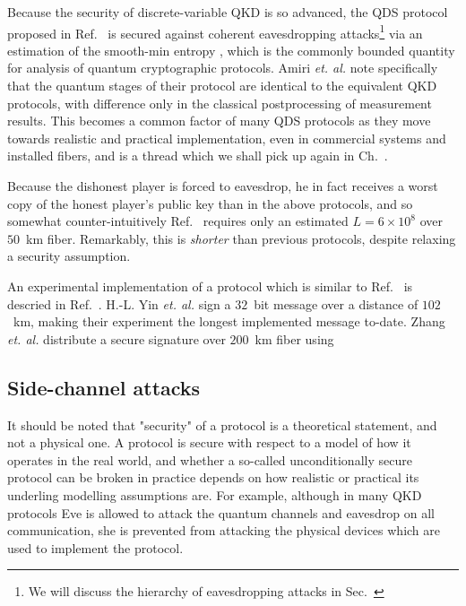 Because the security of discrete-variable QKD is so advanced, the QDS protocol proposed in Ref.~\cite{Amiri2016} is secured against coherent eavesdropping attacks\footnote{We will discuss the hierarchy of eavesdropping attacks in Sec.~} via an estimation of the smooth-min entropy , which is the commonly bounded quantity for analysis of quantum cryptographic protocols. Amiri \emph{et. al.} note specifically that the quantum stages of their protocol are identical to the equivalent QKD protocols, with difference only in the classical postprocessing of measurement results. This becomes a common factor of many QDS protocols as they move towards realistic and practical implementation, even in commercial systems and installed fibers, and is a thread which we shall pick up again in Ch.~.

Because the dishonest player is forced to eavesdrop, he in fact receives a worst copy of the honest player's public key than in the above protocols, and so somewhat counter-intuitively Ref.~\cite{Amiri2016} requires only an estimated $L = 6\times 10^8$ over $50$~km fiber. Remarkably, this is \emph{shorter} than previous protocols, despite relaxing a security assumption.

An experimental implementation of a protocol which is similar to Ref.~\cite{Amiri2016} is descried in Ref.~\cite{Yin2017c}. H.-L. Yin \emph{et. al.} sign a $32$~bit message over a distance of $102$~km, making their experiment the longest implemented message to-date. Zhang \emph{et. al.} distribute a secure signature over $200$~km fiber \cite{Zhang2018b} using 


\subsection*{Side-channel attacks}
It should be noted that "security" of a protocol is a theoretical statement, and not a physical one. A protocol is secure with respect to a model of how it operates in the real world, and whether a so-called unconditionally secure protocol can be broken in practice depends on how realistic or practical its underling modelling assumptions are. For example, although in many QKD protocols Eve is allowed to attack the quantum channels and eavesdrop on all communication, she is prevented from attacking the physical devices which are used to implement the protocol. 

